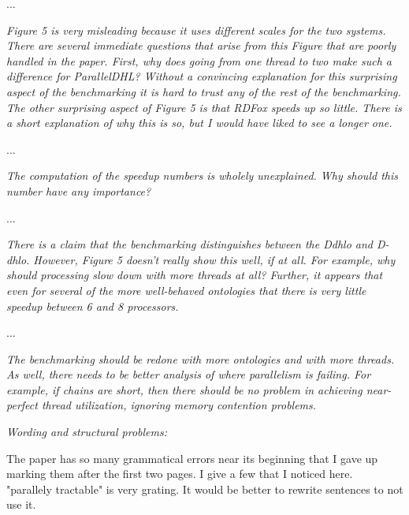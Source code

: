 \documentclass{article}
\let\quoteOld\quote
\let\endquoteOld\endquote
\renewenvironment{quote}{\quoteOld\itshape}{\endquoteOld}
\begin{document}
...

\begin{quote}
Figure 5 is very misleading because it uses different scales for the two
systems.   There are several immediate questions that arise from this Figure
that are poorly handled in the paper.  First, why does going from one thread
to two make such a difference for ParallelDHL?  Without a convincing
explanation for this surprising aspect of the benchmarking it is hard to
trust any of the rest of the benchmarking.  The other surprising aspect of
Figure 5 is that RDFox speeds up so little.  There is a short explanation of
why this is so, but I would have liked to see a longer one.
\end{quote}

...

\begin{quote}
The computation of the speedup numbers is wholely unexplained.  Why should
this number have any importance?
\end{quote}

...

\begin{quote}
There is a claim that the benchmarking distinguishes between the Ddhlo and
D-dhlo.  However, Figure 5 doesn't really show this well, if at all.   For
example, why should processing slow down with more threads at all?  Further,
it appears that even for several of the more well-behaved ontologies that there
is very little speedup between 6 and 8 processors.
\end{quote}

...

\begin{quote}
The benchmarking should be redone with more ontologies and with more
threads.  As well, there needs to be better analysis of where parallelism is
failing.  For example, if chains are short, then there should be no problem
in achieving near-perfect thread utilization, ignoring memory contention
problems.
\end{quote}

\begin{quote}
Wording and structural problems:

The paper has so many grammatical errors near its beginning that I gave up
marking them after the first two pages.  I give a few that I noticed here.\\

"parallely tractable" is very grating.  It would be better to rewrite
sentences to not use it.
\end{quote}
\end{document}

